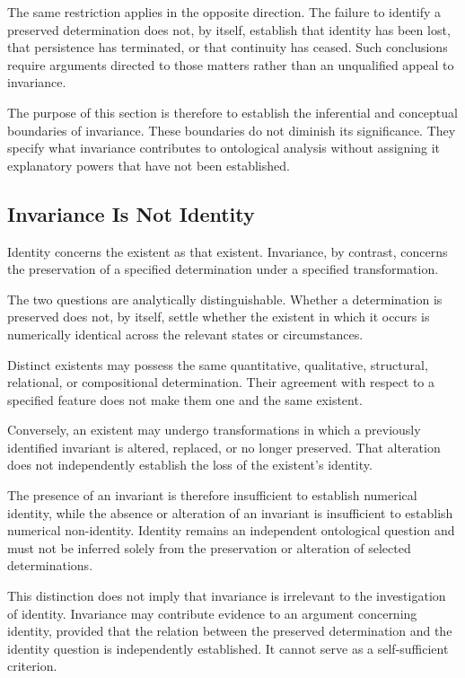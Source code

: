 The same restriction applies in the opposite direction.
The failure to identify a preserved determination does not,
by itself, establish that identity has been lost, that persistence
has terminated, or that continuity has ceased. Such conclusions
require arguments directed to those matters rather than an
unqualified appeal to invariance.

The purpose of this section is therefore to establish the
inferential and conceptual boundaries of invariance. These
boundaries do not diminish its significance. They specify
what invariance contributes to ontological analysis without
assigning it explanatory powers that have not been established.

\subsection{Invariance Is Not Identity}

Identity concerns the existent as that existent. Invariance,
by contrast, concerns the preservation of a specified
determination under a specified transformation.

The two questions are analytically distinguishable. Whether
a determination is preserved does not, by itself, settle
whether the existent in which it occurs is numerically
identical across the relevant states or circumstances.

Distinct existents may possess the same quantitative,
qualitative, structural, relational, or compositional
determination. Their agreement with respect to a specified
feature does not make them one and the same existent.



Conversely, an existent may undergo transformations in which
a previously identified invariant is altered, replaced, or
no longer preserved. That alteration does not independently
establish the loss of the existent's identity.

The presence of an invariant is therefore insufficient to
establish numerical identity, while the absence or alteration
of an invariant is insufficient to establish numerical
non-identity. Identity remains an independent ontological
question and must not be inferred solely from the preservation
or alteration of selected determinations.

This distinction does not imply that invariance is irrelevant
to the investigation of identity. Invariance may contribute
evidence to an argument concerning identity, provided that
the relation between the preserved determination and the
identity question is independently established. It cannot
serve as a self-sufficient criterion.

